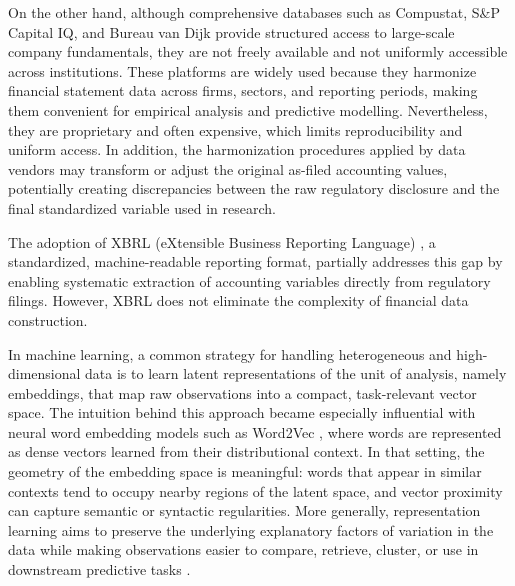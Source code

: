 \documentclass[a4paper,fleqn]{cas-dc}
\begin{document}
On the other hand, although comprehensive databases such as Compustat, S\&P Capital IQ, and Bureau van Dijk provide structured access to large-scale company fundamentals, they are not freely available and not uniformly accessible across institutions. These platforms are widely used because they harmonize financial statement data across firms, sectors, and reporting periods, making them convenient for empirical analysis and predictive modelling. Nevertheless, they are proprietary and often expensive, which limits reproducibility and uniform access. In addition, the harmonization procedures applied by data vendors may transform or adjust the original as-filed accounting values, potentially creating discrepancies between the raw regulatory disclosure and the final standardized variable used in research.

The adoption of XBRL (eXtensible Business Reporting Language) \citep{xbrl2024}, a standardized, machine-readable reporting format, partially addresses this gap by enabling systematic extraction of accounting variables directly from regulatory filings. However, XBRL does not eliminate the complexity of financial data construction. %

In machine learning, a common strategy for handling heterogeneous and high-dimensional data is to learn latent representations of the unit of analysis, namely embeddings, that map raw observations into a compact, task-relevant vector space. The intuition behind this approach became especially influential with neural word embedding models such as Word2Vec \citep{mikolov2013efficient,mikolov2013distributed}, where words are represented as dense vectors learned from their distributional context. In that setting, the geometry of the embedding space is meaningful: words that appear in similar contexts tend to occupy nearby regions of the latent space, and vector proximity can capture semantic or syntactic regularities. More generally, representation learning aims to preserve the underlying explanatory factors of variation in the data while making observations easier to compare, retrieve, cluster, or use in downstream predictive tasks \citep{Bengio2013}.
\end{document}
